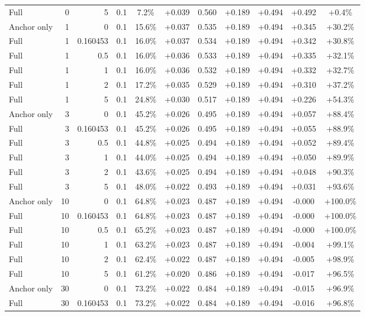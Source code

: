 \begin{table}[htbp]
\begin{tabular}{lrrrccccccc}
Full & 0 & 5 & 0.1 & 7.2\% & +0.039 & 0.560 & +0.189 & +0.494 & +0.492 & +0.4\% \\
Anchor only & 1 & 0 & 0.1 & 15.6\% & +0.037 & 0.535 & +0.189 & +0.494 & +0.345 & +30.2\% \\
Full & 1 & 0.160453 & 0.1 & 16.0\% & +0.037 & 0.534 & +0.189 & +0.494 & +0.342 & +30.8\% \\
Full & 1 & 0.5 & 0.1 & 16.0\% & +0.036 & 0.533 & +0.189 & +0.494 & +0.335 & +32.1\% \\
Full & 1 & 1 & 0.1 & 16.0\% & +0.036 & 0.532 & +0.189 & +0.494 & +0.332 & +32.7\% \\
Full & 1 & 2 & 0.1 & 17.2\% & +0.035 & 0.529 & +0.189 & +0.494 & +0.310 & +37.2\% \\
Full & 1 & 5 & 0.1 & 24.8\% & +0.030 & 0.517 & +0.189 & +0.494 & +0.226 & +54.3\% \\
Anchor only & 3 & 0 & 0.1 & 45.2\% & +0.026 & 0.495 & +0.189 & +0.494 & +0.057 & +88.4\% \\
Full & 3 & 0.160453 & 0.1 & 45.2\% & +0.026 & 0.495 & +0.189 & +0.494 & +0.055 & +88.9\% \\
Full & 3 & 0.5 & 0.1 & 44.8\% & +0.025 & 0.494 & +0.189 & +0.494 & +0.052 & +89.4\% \\
Full & 3 & 1 & 0.1 & 44.0\% & +0.025 & 0.494 & +0.189 & +0.494 & +0.050 & +89.9\% \\
Full & 3 & 2 & 0.1 & 43.6\% & +0.025 & 0.494 & +0.189 & +0.494 & +0.048 & +90.3\% \\
Full & 3 & 5 & 0.1 & 48.0\% & +0.022 & 0.493 & +0.189 & +0.494 & +0.031 & +93.6\% \\
Anchor only & 10 & 0 & 0.1 & 64.8\% & +0.023 & 0.487 & +0.189 & +0.494 & -0.000 & +100.0\% \\
Full & 10 & 0.160453 & 0.1 & 64.8\% & +0.023 & 0.487 & +0.189 & +0.494 & -0.000 & +100.0\% \\
Full & 10 & 0.5 & 0.1 & 65.2\% & +0.023 & 0.487 & +0.189 & +0.494 & -0.000 & +100.0\% \\
Full & 10 & 1 & 0.1 & 63.2\% & +0.023 & 0.487 & +0.189 & +0.494 & -0.004 & +99.1\% \\
Full & 10 & 2 & 0.1 & 62.4\% & +0.022 & 0.487 & +0.189 & +0.494 & -0.005 & +98.9\% \\
Full & 10 & 5 & 0.1 & 61.2\% & +0.020 & 0.486 & +0.189 & +0.494 & -0.017 & +96.5\% \\
Anchor only & 30 & 0 & 0.1 & 73.2\% & +0.022 & 0.484 & +0.189 & +0.494 & -0.015 & +96.9\% \\
Full & 30 & 0.160453 & 0.1 & 73.2\% & +0.022 & 0.484 & +0.189 & +0.494 & -0.016 & +96.8\% \\

\end{tabular}
\end{table}
